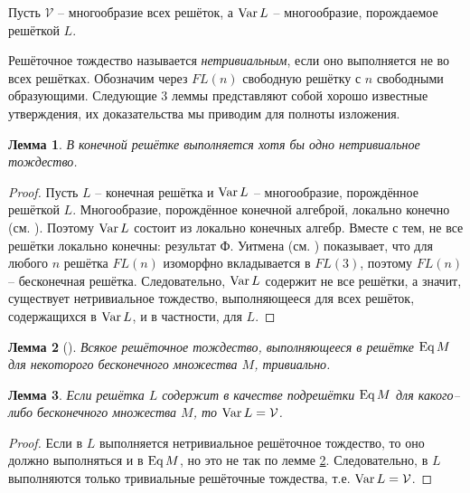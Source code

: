 \documentclass[a4paper]{article}
\newtheorem{lemma}{Лемма}
\newcommand{\Eq}{\textnormal{Eq}\, }
\newcommand{\Var}{\textnormal{Var}\, }
\begin{document}
	\par Пусть $\mathcal{V}$ -- многообразие всех решёток, а $\Var L$ -- многообразие, порождаемое решёткой $L$.
	
	Решёточное тождество называется \textit{нетривиальным}, если оно выполняется не во всех решётках. Обозначим через $FL(n)$ свободную решётку с $n$ свободными образующими. Следующие 3 леммы представляют собой хорошо известные утверждения, их доказательства мы приводим для полноты изложения.
	\begin{lemma} \label{lb0}
	    В конечной решётке выполняется хотя бы одно нетривиальное тождество.
	\end{lemma}
	\begin{proof}
	    Пусть $L$ -- конечная решётка и $\Var L$ -- многообразие, порождённое решёткой $L$. Многообразие, порождённое конечной алгеброй, локально конечно (см. \cite[следствие 3.14]{kon}). Поэтому $\Var L$ состоит из локально конечных алгебр. Вместе с тем, не все решётки локально конечны: результат Ф. Уитмена (см. \cite[\S5, теорема 3]{skorn}) показывает, что для любого $n$ решётка $FL(n)$ изоморфно вкладывается в $FL(3)$, поэтому $FL(n)$ -- бесконечная решётка. Следовательно, $\Var L$ содержит не все решётки, а значит, существует нетривиальное тождество, выполняющееся для всех решёток, содержащихся в $\Var L$, и в частности, для $L$.
	\end{proof}
	\begin{lemma}[\cite{sachs}] \label{lb1}
		Всякое решёточное тождество, выполняющееся в решётке $\Eq M$ для некоторого бесконечного множества $M$, тривиально.
	\end{lemma}
	
	\begin{lemma} \label{la1}
		Если решётка $L$ содержит в качестве подрешётки $\Eq M$ для какого--либо бесконечного множества $M$, то $\Var L = \mathcal{V}$.
	\end{lemma}
	\begin{proof}
		Если в $L$ выполняется нетривиальное решёточное тождество, то оно должно выполняться и в $\Eq M$, но это не так по лемме \ref{lb1}. Следовательно, в $L$ выполняются только тривиальные решёточные тождества, т.е. $\Var L = \mathcal{V}$.
	\end{proof}
	
\end{document}
